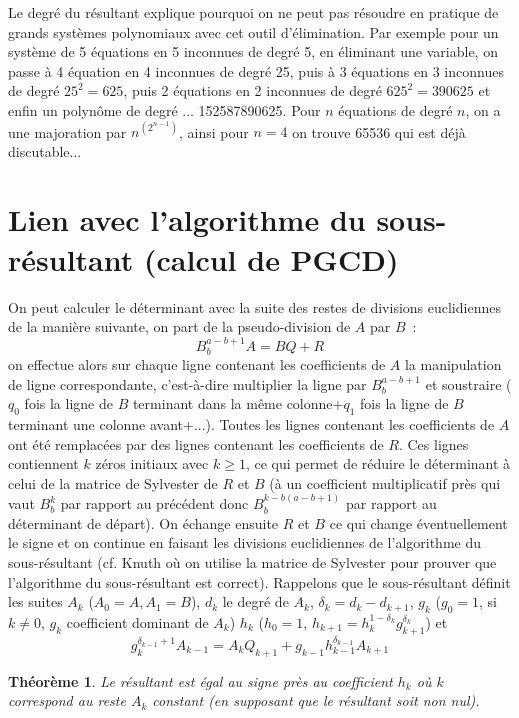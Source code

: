 \documentclass[a4paper,11pt]{book}
\newtheorem{thm}{Théorème}
\begin{document}
\begin{giacjshere}
Le degr\'e du r\'esultant explique pourquoi on ne peut pas r\'esoudre
en pratique de grands syst\`emes polynomiaux avec cet outil
d'\'elimination.
Par exemple pour un syst\`eme de 5 \'equations en 5 inconnues de
degr\'e 5, en \'eliminant une variable, on passe \`a 4 \'equation en
4 inconnues de degr\'e 25, puis \`a 3 \'equations en 3 inconnues
de degr\'e $25^2=625$, puis 2 \'equations en 2 inconnues de
degr\'e $625^2=390625$ et enfin un polyn\^ome de degr\'e ...
152587890625. Pour $n$ \'equations de degr\'e $n$, on a une majoration
par $n^{(2^{n-1})}$, ainsi pour $n=4$ on trouve 65536 qui est d\'ej\`a discutable...

\section{Lien avec l'algorithme du sous-résultant (calcul de PGCD)}
On peut calculer le déterminant avec la suite des restes de divisions
euclidiennes de la manière suivante, on part de la pseudo-division
de $A$ par $B$~:
\[ B_b^{a-b+1} A=BQ+R \]
on effectue alors sur chaque ligne contenant les coefficients de $A$
la manipulation de ligne correspondante, c'est-à-dire multiplier
la ligne par $B_b^{a-b+1}$ et soustraire ($q_0$ fois la ligne
de $B$ terminant dans la même colonne+$q_1$ fois la ligne
de $B$ terminant une colonne avant+...). Toutes les lignes
contenant les coefficients de $A$ ont été remplacées par des lignes 
contenant les coefficients de $R$. Ces lignes contiennent $k$ zéros initiaux
avec $k \geq 1$, ce qui permet de réduire le déterminant à celui
de la matrice de Sylvester de $R$ et $B$ (à un coefficient multiplicatif
près qui vaut $B_b^k$ par rapport au précédent donc
$B_b^{k-b(a-b+1)}$ par rapport au déterminant de départ). 
On échange ensuite $R$ et $B$ ce qui change
éventuellement le signe et on continue en faisant les
divisions euclidiennes de l'algorithme du sous-r\'esultant (cf.
Knuth o\`u on utilise la matrice de Sylvester pour prouver que
l'algorithme du sous-r\'esultant est correct). Rappelons que
le sous-résultant définit les suites $A_k$ ($A_0=A, A_1=B$),
$d_k$ le degré de $A_k$, $\delta_k=d_k-d_{k+1}$,
$g_k$ ($g_0=1$, si $k\neq 0$, $g_k$ coefficient dominant de $A_k$) 
$h_k$ ($h_0=1$, $h_{k+1}=h_k^{1-\delta_k} g_{k+1}^{\delta_k}$) et
\[ g_k^{\delta_{k-1}+1} A_{k-1} = A_k Q_{k+1} + 
g_{k-1} h_{k-1}^{\delta_{k-1}} A_{k+1} \]
\begin{thm}
Le résultant est égal au signe près au coefficient $h_k$ où $k$
correspond au reste $A_k$ constant (en supposant que le résultant
soit non nul).
\end{thm}


\end{giacjshere}
\end{document}
